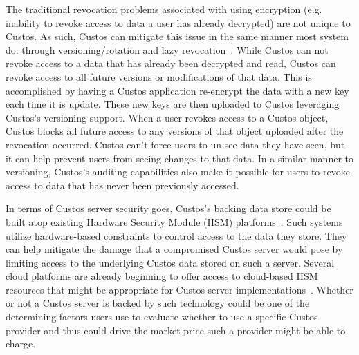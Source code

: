 The traditional revocation problems associated with using encryption
(e.g. inability to revoke access to data a user has already decrypted)
are not unique to Custos. As such, Custos can mitigate this issue in
the same manner most system do: through versioning/rotation and lazy
revocation~\cite{Kallahalla2003}. While Custos can not revoke access
to a data that has already been decrypted and read, Custos can revoke
access to all future versions or modifications of that data. This is
accomplished by having a Custos application re-encrypt the data with a
new key each time it is update. These new keys are then uploaded to
Custos leveraging Custos's versioning support. When a user revokes
access to a Custos object, Custos blocks all future access to any
versions of that object uploaded after the revocation occurred. Custos
can't force users to un-see data they have seen, but it can help
prevent users from seeing changes to that data. In a similar manner to
versioning, Custos's auditing capabilities also make it possible for
users to revoke access to data that has never been previously
accessed.

In terms of Custos server security goes, Custos's backing data store
could be built atop existing Hardware Security Module (HSM)
platforms~\cite{fips140}. Such systems utilize hardware-based
constraints to control access to the data they store. They can help
mitigate the damage that a compromised Custos server would pose by
limiting access to the underlying Custos data stored on such a
server. Several cloud platforms are already beginning to offer access
to cloud-based HSM resources that might be appropriate for Custos
server implementations~\cite{amazon-hsm}. Whether or not a Custos
server is backed by such technology could be one of the determining
factors users use to evaluate whether to use a specific Custos
provider and thus could drive the market price such a provider might
be able to charge.

